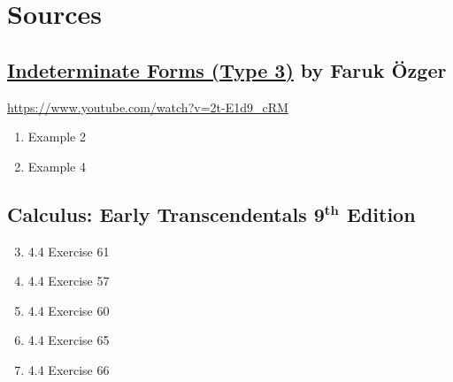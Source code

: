 \documentclass[12pt, A4]{report}
\begin{document}
		\section*{Sources}
			\subsection*{\href{https://www.youtube.com/watch?v=2t-E1d9_cRM}{Indeterminate Forms (Type 3)} by Faruk \"{O}zger}
				\qquad \href{https://www.youtube.com/watch?v=2t-E1d9_cRM}{https://www.youtube.com/watch?v=2t-E1d9\_cRM}
				\begin{enumerate}
					\item
						Example 2
						\setcounter{enumi}{5}
					\item
						Example 4
				\end{enumerate}
			\subsection*{Calculus: Early Transcendentals 9$^{\textbf{th}}$ Edition}
				\begin{enumerate}
					\setcounter{enumi}{2}
					\item
						4.4 Exercise 61
						\setcounter{enumi}{4}
					\item
						4.4 Exercise 57
						\setcounter{enumi}{7}
					\item
						4.4 Exercise 60
					\item
						4.4 Exercise 65
					\item
						4.4 Exercise 66
				\end{enumerate}
			\newpage
\end{document}
